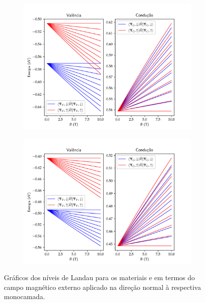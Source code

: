 \begin{figure}[p]
  \centering
  \begin{subfigure}{\textwidth}
    \includegraphics[width=\textwidth]{imagens/crs2_landau_levels.png}
    \caption{}
    \label{fig:crs2_landau_levels}
  \end{subfigure}
  \begin{subfigure}{0.9\textwidth}
    \includegraphics[width=\textwidth]{imagens/crse2_landau_levels.png}
    \caption{}
    \label{fig:crse2_landau_levels}
  \end{subfigure}
  \caption{
    Gráficos dos níveis de Landau para os materiais 
     e 
     em termos do campo magnético externo
    aplicado na direção normal à respectiva monocamada.
  }
  \label{fig:landau_levels}
\end{figure}



